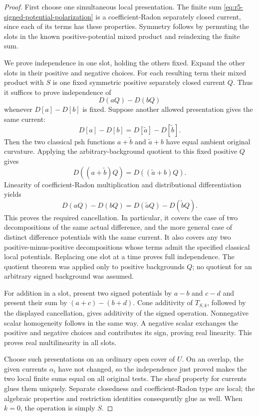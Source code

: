 \documentclass[11pt,a4paper]{article}
\numberwithin{equation}{section}
\theoremstyle{definition}
\theoremstyle{remark}
\begin{document}
\begin{proof}
First choose one simultaneous local presentation.  The finite
sum \eqref{eq:r5-signed-potential-polarization} is a
coefficient-Radon separately closed current, since each of its
terms has these properties.  Symmetry follows by permuting
the slots in the known positive-potential mixed product and
reindexing the finite sum.

We prove independence in one slot, holding the others fixed.
Expand the other slots in their positive and negative choices.
For each resulting term their mixed product with $S$ is one
fixed symmetric positive separately closed current $Q$.
Thus it suffices to prove independence of
\[
                              D(aQ)-D(bQ)
\]
whenever $D[a]-D[b]$ is fixed.  Suppose another allowed
presentation gives the same current:
\[
                   D[a]-D[b]=D[\widetilde a]-D[\widetilde b].
\]
Then the two classical psh functions
$a+\widetilde b$ and $\widetilde a+b$ have equal ambient
original curvature.  Applying the arbitrary-background
quotient to this fixed positive $Q$ gives
\[
                D((a+\widetilde b)Q)
                    =D((\widetilde a+b)Q).
\]
Linearity of coefficient-Radon multiplication and
distributional differentiation yields
\[
                D(aQ)-D(bQ)
                    =D(\widetilde aQ)-D(\widetilde bQ).
\]
This proves the required cancellation.  In particular, it
covers the case of two decompositions of the same actual
difference, and the more general case of distinct difference
potentials with the same current.  It also covers any two
positive-minus-positive decompositions whose terms admit the
specified classical local potentials.  Replacing one slot
at a time proves full independence.  The quotient theorem
was applied only to positive backgrounds $Q$; no quotient
for an arbitrary signed background was assumed.

For addition in a slot, present two signed potentials by
$a-b$ and $c-d$ and present their sum by
$(a+c)-(b+d)$.  Cone additivity of $T_{S,k}$, followed by
the displayed cancellation, gives additivity of the signed
operation.  Nonnegative scalar homogeneity follows in the
same way.  A negative scalar exchanges the positive and
negative choices and contributes its sign, proving real
linearity.  This proves real multilinearity in all slots.

Choose such presentations on an ordinary open cover of $U$.
On an overlap, the given currents $\alpha_i$ have not changed,
so the independence just proved makes the two local finite
sums equal on all original tests.  The sheaf property for
currents glues them uniquely.  Separate closedness and
coefficient-Radon type are local; the algebraic properties
and restriction identities consequently glue as well.
When $k=0$, the operation is simply $S$.
\end{proof}
\end{document}
